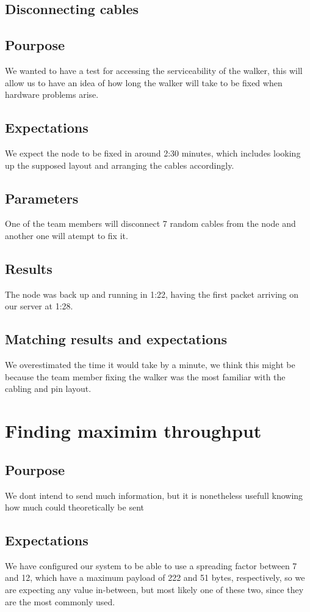 \subsection{Disconnecting cables}

	\subsection{Pourpose}
		We wanted to have a test for accessing the serviceability of the walker, this will allow us to have an idea of how long the walker will take to be fixed when hardware problems arise.
	\subsection{Expectations}
		We expect the node to be fixed in around 2:30 minutes, which includes looking up the supposed layout and arranging the cables accordingly.
	\subsection{Parameters}
		One of the team members will disconnect 7 random cables from the node and another one will atempt to fix it.
	\subsection{Results}
		The node was back up and running in 1:22, having the first packet arriving on our server at 1:28.
	\subsection{Matching results and expectations}
		We overestimated the time it would take by a minute, we think this might be because the team member fixing the walker was the most familiar with the cabling and pin layout.

\section{Finding maximim throughput}

	\subsection{Pourpose}
		We dont intend to send much information, but it is nonetheless usefull knowing how much could theoretically be sent
	\subsection{Expectations}
		We have configured our system to be able to use a spreading factor between 7 and 12, which have a maximum payload of 222 and 51 bytes, respectively, so we are expecting any value in-between, but most likely one of these two, since they are the most commonly used.
